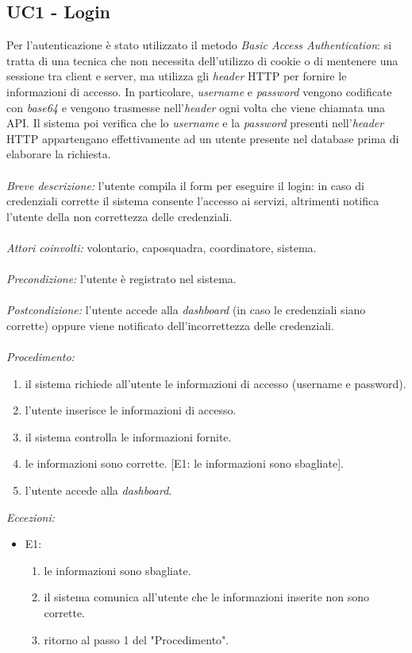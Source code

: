 \subsection{UC1 - Login}
Per l'autenticazione è stato utilizzato il metodo \textit{Basic Access Authentication}: si tratta di una tecnica che non necessita dell'utilizzo di cookie o di mentenere una sessione tra client e server, ma utilizza gli \textit{header} HTTP per fornire le informazioni di accesso. In particolare, \textit{username} e \textit{password} vengono codificate con \textit{base64} e vengono trasmesse nell'\textit{header} ogni volta che viene chiamata una API. Il sistema poi verifica che lo \textit{username} e la \textit{password} presenti nell'\textit{header} HTTP appartengano effettivamente ad un utente presente nel database prima di elaborare la richiesta. 
\\
\\
\textit{Breve descrizione:} l'utente compila il form per eseguire il login: in caso di credenziali corrette il sistema consente l'accesso ai servizi, altrimenti notifica l'utente della non correttezza delle credenziali. 
\\
\\
\textit{Attori coinvolti:} volontario, caposquadra, coordinatore, sistema.
\\
\\
\textit{Precondizione:} l'utente è registrato nel sistema.
\\
\\
\textit{Postcondizione:} l'utente accede alla \textit{dashboard} (in caso le credenziali siano corrette) oppure viene notificato dell'incorrettezza delle credenziali.
\\
\\
\textit{Procedimento:}
\begin{enumerate}
	\item il sistema richiede all'utente le informazioni di accesso (username e password).
	\item l'utente inserisce le informazioni di accesso.
	\item il sistema controlla le informazioni fornite.
	\item le informazioni sono corrette. [E1: le informazioni sono sbagliate].
	\item l'utente accede alla \textit{dashboard}.
\end{enumerate}


\textit{Eccezioni:}
\begin{itemize}
	\item E1:
	\begin{enumerate}
		\item le informazioni sono sbagliate.
		\item il sistema comunica all'utente che le informazioni inserite non sono corrette.
		\item ritorno al passo 1 del "Procedimento".
	\end{enumerate}
\end{itemize}



